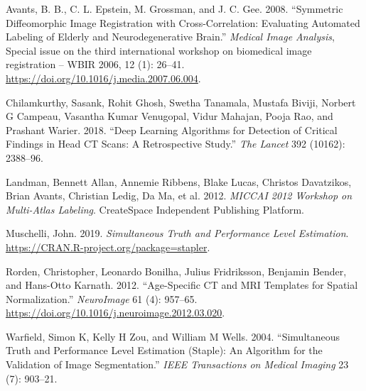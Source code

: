 \documentclass[]{elsarticle} %
\newlength{\cslhangindent}
\newenvironment{cslreferences}%
  {\setlength{\parindent}{0pt}%
  \everypar{\setlength{\hangindent}{\cslhangindent}}\ignorespaces}%
  {\par}
\begin{document}
\hypertarget{refs}{}
\begin{cslreferences}
\leavevmode\hypertarget{ref-avants_symmetric_2008}{}%
Avants, B. B., C. L. Epstein, M. Grossman, and J. C. Gee. 2008. ``Symmetric Diffeomorphic Image Registration with Cross-Correlation: Evaluating Automated Labeling of Elderly and Neurodegenerative Brain.'' \emph{Medical Image Analysis}, Special issue on the third international workshop on biomedical image registration -- WBIR 2006, 12 (1): 26--41. \url{https://doi.org/10.1016/j.media.2007.06.004}.

\leavevmode\hypertarget{ref-cq500}{}%
Chilamkurthy, Sasank, Rohit Ghosh, Swetha Tanamala, Mustafa Biviji, Norbert G Campeau, Vasantha Kumar Venugopal, Vidur Mahajan, Pooja Rao, and Prashant Warier. 2018. ``Deep Learning Algorithms for Detection of Critical Findings in Head CT Scans: A Retrospective Study.'' \emph{The Lancet} 392 (10162): 2388--96.

\leavevmode\hypertarget{ref-bennett2012miccai}{}%
Landman, Bennett Allan, Annemie Ribbens, Blake Lucas, Christos Davatzikos, Brian Avants, Christian Ledig, Da Ma, et al. 2012. \emph{MICCAI 2012 Workshop on Multi-Atlas Labeling}. CreateSpace Independent Publishing Platform.

\leavevmode\hypertarget{ref-stapler}{}%
Muschelli, John. 2019. \emph{Simultaneous Truth and Performance Level Estimation}. \url{https://CRAN.R-project.org/package=stapler}.

\leavevmode\hypertarget{ref-rorden_age-specific_2012}{}%
Rorden, Christopher, Leonardo Bonilha, Julius Fridriksson, Benjamin Bender, and Hans-Otto Karnath. 2012. ``Age-Specific CT and MRI Templates for Spatial Normalization.'' \emph{NeuroImage} 61 (4): 957--65. \url{https://doi.org/10.1016/j.neuroimage.2012.03.020}.

\leavevmode\hypertarget{ref-warfield2004simultaneous}{}%
Warfield, Simon K, Kelly H Zou, and William M Wells. 2004. ``Simultaneous Truth and Performance Level Estimation (Staple): An Algorithm for the Validation of Image Segmentation.'' \emph{IEEE Transactions on Medical Imaging} 23 (7): 903--21.
\end{cslreferences}
\end{document}
